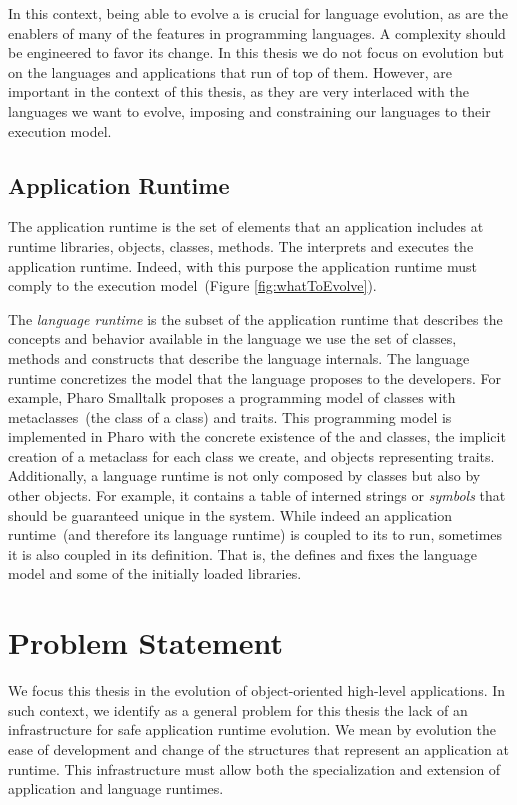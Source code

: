 In this context, being able to evolve a \VM is crucial for language evolution, as \VMs are the enablers of many of the features in programming languages. A \VM complexity should be engineered to favor its change. In this thesis we do not focus on \VM evolution but on the languages and applications that run of top of them. However, \VMs are important in the context of this thesis, as they are very interlaced with the languages we want to evolve, imposing and constraining our languages to their execution model.

\subsection{Application Runtime}

The application runtime is the set of elements that an application includes at runtime \eg libraries, objects, classes, methods. The \VM interprets and executes the application runtime. Indeed, with this purpose the application runtime must comply to the \VM execution model~(Figure \ref{fig:whatToEvolve}).

The \emph{language runtime} is the subset of the application runtime that describes the concepts and behavior available in the language we use \ie the set of classes, methods and constructs that describe the language internals. The language runtime concretizes the model that the language proposes to the developers. For example, Pharo Smalltalk proposes a programming model of classes with metaclasses~(the class of a class) and traits. This programming model is implemented in Pharo with the concrete existence of the  and  classes, the implicit creation of a metaclass for each class we create, and objects representing traits. Additionally, a language runtime is not only composed by classes but also by other objects. For example, it contains a table of interned strings or \emph{symbols} that should be guaranteed unique in the system.
While indeed an application runtime~(and therefore its language runtime) is coupled to its \VM to run, sometimes it is also coupled in its definition. That is, the \VM defines and fixes the language model and some of the initially loaded libraries.

\section{Problem Statement}

We focus this thesis in the evolution of object-oriented high-level applications. In such context, we identify as a general problem for this thesis the lack of an infrastructure for safe application runtime evolution. We mean by evolution the ease of development and change of the structures that represent an application at runtime. This infrastructure must allow both the specialization and extension of application and language runtimes.

